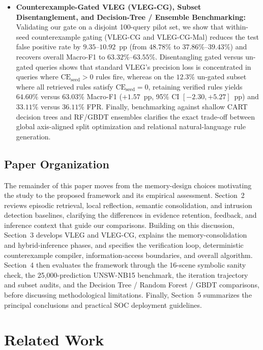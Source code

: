 \documentclass[10pt,a4paper,onecolumn]{article}
\theoremstyle{definition}
\theoremstyle{remark}
\begin{document}
\begin{itemize}[leftmargin=1.8em]
    \item \textbf{Counterexample-Gated VLEG (VLEG-CG), Subset Disentanglement, and Decision-Tree / Ensemble Benchmarking:} Validating our gate on a disjoint 100-query pilot set, we show that within-seed counterexample gating (VLEG-CG and VLEG-CG-Mal) reduces the test false positive rate by $9.35$--$10.92$~pp (from $48.78\%$ to $37.86\%$--$39.43\%$) and recovers overall Macro-F1 to $63.32\%$--$63.55\%$. Disentangling gated versus un-gated queries shows that standard VLEG's precision loss is concentrated in queries where $\mathrm{CE}_{\mathrm{seed}}>0$ rules fire, whereas on the $12.3\%$ un-gated subset where all retrieved rules satisfy $\mathrm{CE}_{\mathrm{seed}}=0$, retaining verified rules yields $64.60\%$ versus $63.03\%$ Macro-F1 ($+1.57$~pp, 95\% CI $[-2.30, +5.27]$~pp) and $33.11\%$ versus $36.11\%$ FPR. Finally, benchmarking against shallow CART decision trees and RF/GBDT ensembles clarifies the exact trade-off between global axis-aligned split optimization and relational natural-language rule generation.
\end{itemize}

\subsection{Paper Organization}
The remainder of this paper moves from the memory-design choices motivating the study to the proposed framework and its empirical assessment. Section~2 reviews episodic retrieval, local reflection, semantic consolidation, and intrusion detection baselines, clarifying the differences in evidence retention, feedback, and inference context that guide our comparisons. Building on this discussion, Section~3 develops VLEG and VLEG-CG, explains the memory-consolidation and hybrid-inference phases, and specifies the verification loop, deterministic counterexample compiler, information-access boundaries, and overall algorithm. Section~4 then evaluates the framework through the 16-scene symbolic sanity check, the 25,000-prediction UNSW-NB15 benchmark, the iteration trajectory and subset audits, and the Decision Tree / Random Forest / GBDT comparisons, before discussing methodological limitations. Finally, Section~5 summarizes the principal conclusions and practical SOC deployment guidelines.

\section{Related Work}
\end{document}
